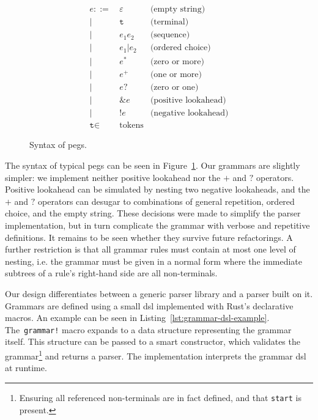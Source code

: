 \begin{figure}[h]
	\centering
	\begin{align*}
		e ::= & \hspace{2pt} \varepsilon & \text{(empty string)} \\
		\mid  & \hspace{2pt} \texttt{t}  & \text{(terminal)} \\
		\mid  & \hspace{2pt} e_1 e_2     & \text{(sequence)} \\
		\mid  & \hspace{2pt} e_1 | e_2   & \text{(ordered choice)} \\
		\mid  & \hspace{2pt} e^*         & \text{(zero or more)} \\
		\mid  & \hspace{2pt} e^+         & \text{(one or more)} \\
		\mid  & \hspace{2pt} e?          & \text{(zero or one)} \\
		\mid  & \hspace{2pt} \&e         & \text{(positive lookahead)} \\
		\mid  & \hspace{2pt} !e          & \text{(negative lookahead)} \\
		\texttt{t} \in & \hspace{2pt} \text{tokens}
	\end{align*}
	\caption{Syntax of \acrlong{peg}s.}
	\label{fig:peg-syntax}
\end{figure}

The syntax of typical \acrlong{peg}s can be seen in Figure~\ref{fig:peg-syntax}.
Our grammars are slightly simpler: we implement neither positive lookahead nor
the $+$ and $?$ operators. Positive lookahead can be simulated by nesting two
negative lookaheads, and the $+$ and $?$ operators can desugar to combinations
of general repetition, ordered choice, and the empty string. These decisions
were made to simplify the parser implementation, but in turn complicate the
grammar with verbose and repetitive definitions. It remains to be seen whether
they survive future refactorings. A further restriction is that all grammar
rules must contain at most one level of nesting, i.e. the grammar must be given
in a normal form where the immediate subtrees of a rule's right-hand side are
all non-terminals.

Our design differentiates between a generic parser library and a parser built on
it. Grammars are defined using a small \acrshort{dsl} implemented with Rust's
declarative macros. An example can be seen in
Listing~\ref{lst:grammar-dsl-example}. The~\texttt{grammar!} macro expands to a
data structure representing the grammar itself. This structure can be passed to
a smart constructor, which validates the grammar\footnote{Ensuring all
referenced non-terminals are in fact defined, and that \texttt{start} is
present.} and returns a parser. The implementation interprets the grammar
\acrshort{dsl} at runtime.

